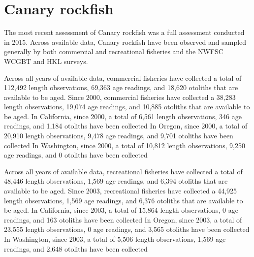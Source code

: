 \documentclass[11pt,
  english,
  letterpaper,
]{article}
\begin{document}
\hypertarget{canary-rockfish}{%
\section{Canary rockfish}\label{canary-rockfish}}

\leavevmode\tagmcend\tagstructend


The most recent assessment of Canary rockfish was a full assessment conducted in 2015. Across available data, Canary rockfish have been observed and sampled generally by both commercial and recreational fisheries and the NWFSC WCGBT and HKL surveys.

\leavevmode\tagmcend\tagstructend\par


Across all years of available data, commercial fisheries have collected a total of 112,492 length observations, 69,363 age readings, and 18,620 otoliths that are available to be aged. Since 2000, commercial fisheries have collected a 38,283 length observations, 19,074 age readings, and 10,885 otoliths that are available to be aged. In California, since 2000, a total of 6,561 length observations, 346 age readings, and 1,184 otoliths have been collected In Oregon, since 2000, a total of 20,910 length observations, 9,478 age readings, and 9,701 otoliths have been collected In Washington, since 2000, a total of 10,812 length observations, 9,250 age readings, and 0 otoliths have been collected

\leavevmode\tagmcend\tagstructend\par


Across all years of available data, recreational fisheries have collected a total of 48,446 length observations, 1,569 age readings, and 6,394 otoliths that are available to be aged. Since 2003, recreational fisheries have collected a 44,925 length observations, 1,569 age readings, and 6,376 otoliths that are available to be aged. In California, since 2003, a total of 15,864 length observations, 0 age readings, and 163 otoliths have been collected In Oregon, since 2003, a total of 23,555 length observations, 0 age readings, and 3,565 otoliths have been collected In Washington, since 2003, a total of 5,506 length observations, 1,569 age readings, and 2,648 otoliths have been collected
\end{document}
